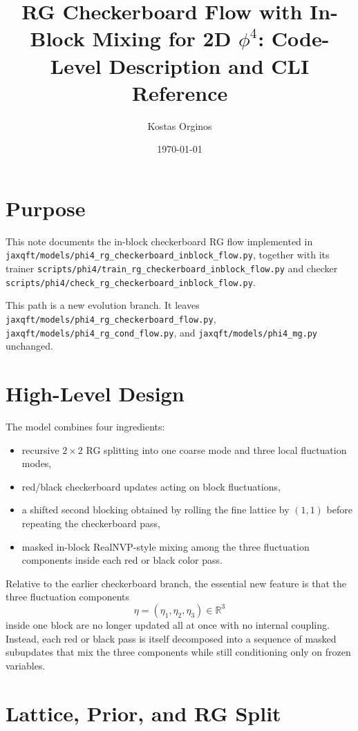 \documentclass[11pt]{article}
\title{RG Checkerboard Flow with In-Block Mixing for 2D $\phi^4$: Code-Level Description and CLI Reference}
\author{Kostas Orginos}
\date{\today}
\begin{document}
\maketitle

\section{Purpose}

This note documents the in-block checkerboard RG flow implemented in
\texttt{jaxqft/models/phi4\_rg\_checkerboard\_inblock\_flow.py}, together with
its trainer
\texttt{scripts/phi4/train\_rg\_checkerboard\_inblock\_flow.py}
and checker
\texttt{scripts/phi4/check\_rg\_checkerboard\_inblock\_flow.py}.

This path is a new evolution branch. It leaves
\texttt{jaxqft/models/phi4\_rg\_checkerboard\_flow.py},
\texttt{jaxqft/models/phi4\_rg\_cond\_flow.py}, and
\texttt{jaxqft/models/phi4\_mg.py} unchanged.

\section{High-Level Design}

The model combines four ingredients:
\begin{itemize}
\item recursive $2\times 2$ RG splitting into one coarse mode and three local
fluctuation modes,
\item red/black checkerboard updates acting on block fluctuations,
\item a shifted second blocking obtained by rolling the fine lattice by
$(1,1)$ before repeating the checkerboard pass,
\item masked in-block RealNVP-style mixing among the three fluctuation
components inside each red or black color pass.
\end{itemize}

Relative to the earlier checkerboard branch, the essential new feature is that
the three fluctuation components
\[
\eta=(\eta_1,\eta_2,\eta_3)\in\mathbb{R}^3
\]
inside one block are no longer updated all at once with no internal coupling.
Instead, each red or black pass is itself decomposed into a sequence of masked
subupdates that mix the three components while still conditioning only on
frozen variables.

\section{Lattice, Prior, and RG Split}
\end{document}
